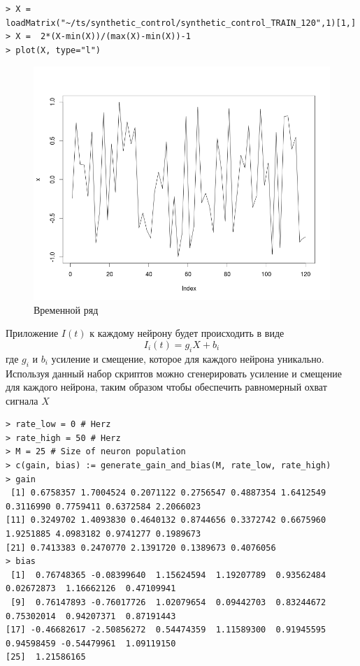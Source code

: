 \documentclass[a4paper,10pt,usenames]{article}
\begin{document}
\begin{lstlisting}
> X = loadMatrix("~/ts/synthetic_control/synthetic_control_TRAIN_120",1)[1,]
> X =  2*(X-min(X))/(max(X)-min(X))-1
> plot(X, type="l")
\end{lstlisting}

\begin{figure}[ht]
\centering
\captionsetup{justification=centering,margin=1cm}
\includegraphics[width=120mm,scale=1]{synthetic_control.png}
\caption{Временной ряд}
\label{synth_control}
\end{figure}
Приложение $I(t)$ к каждому нейрону будет происходить в виде
\begin{equation}
I_{i}(t) = g_{i}X + b_{i}
\end{equation} 
где $g_{i}$ и $b_{i}$ усиление и смещение, которое для каждого нейрона уникально.\\
\indent Используя данный набор скриптов можно сгенерировать усиление и смещение для каждого нейрона, таким образом чтобы обеспечить равномерный охват сигнала $X$
\clearpage
\begin{lstlisting}
> rate_low = 0 # Herz
> rate_high = 50 # Herz
> M = 25 # Size of neuron population
> c(gain, bias) := generate_gain_and_bias(M, rate_low, rate_high)
> gain
 [1] 0.6758357 1.7004524 0.2071122 0.2756547 0.4887354 1.6412549 0.3116990 0.7759411 0.6372584 2.2066023
[11] 0.3249702 1.4093830 0.4640132 0.8744656 0.3372742 0.6675960 1.9251885 4.0983182 0.9741277 0.1989673
[21] 0.7413383 0.2470770 2.1391720 0.1389673 0.4076056
> bias
 [1]  0.76748365 -0.08399640  1.15624594  1.19207789  0.93562484  0.02672873  1.16662126  0.47109941
 [9]  0.76147893 -0.76017726  1.02079654  0.09442703  0.83244672  0.75302014  0.94207371  0.87191443
[17] -0.46682617 -2.50856272  0.54474359  1.11589300  0.91945595  0.94598459 -0.54479961  1.09119150
[25]  1.21586165
\end{lstlisting}
\end{document}
